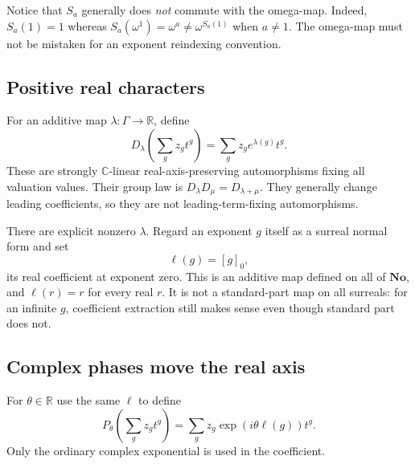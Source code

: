 \documentclass[11pt]{article}
\theoremstyle{definition}
\theoremstyle{remark}
\newcommand{\No}{\mathbf{No}}
\newcommand{\R}{\mathbb R}
\newcommand{\C}{\mathbb C}
\numberwithin{equation}{section}
\begin{document}
Notice that $S_a$ generally does \emph{not} commute with the omega-map.
Indeed, $S_a(1)=1$ whereas
$S_a(\omega^1)=\omega^a\ne\omega^{S_a(1)}$ when $a\ne1$.
The omega-map must not be mistaken for an exponent reindexing convention.

\subsection{Positive real characters}

For an additive map $\lambda:\Gamma\to\R$, define
\[
 D_\lambda\left(\sum_g z_g t^g\right)
 =\sum_g z_g e^{\lambda(g)}t^g.
\]
These are strongly $\C$-linear real-axis-preserving automorphisms fixing
all valuation values. Their group law is
$D_\lambda D_\mu=D_{\lambda+\mu}$. They generally change leading
coefficients, so they are not leading-term-fixing automorphisms.

There are explicit nonzero $\lambda$. Regard an exponent $g$ itself as a
surreal normal form and set
\begin{equation}\label{saut:eq:ell}
 \ell(g)=[g]_0,
\end{equation}
its real coefficient at exponent zero. This is an additive map defined on
all of $\No$, and $\ell(r)=r$ for every real $r$. It is not a standard-part
map on all surreals: for an infinite $g$, coefficient extraction still makes
sense even though standard part does not.

\subsection{Complex phases move the real axis}

For $\theta\in\R$ use the same $\ell$ to define
\begin{equation}\label{saut:eq:phase}
 P_\theta\left(\sum_g z_g t^g\right)
 =\sum_g z_g\exp(i\theta\ell(g))t^g.
\end{equation}
Only the ordinary complex exponential is used in the coefficient.
\end{document}
